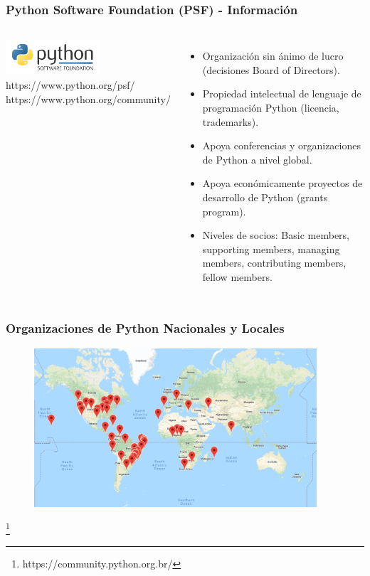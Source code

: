 \documentclass[18pt]{beamer}
\newcommand\blfootnote[1]{%
  \begingroup
  \renewcommand\thefootnote{}\footnote{#1}%
  \addtocounter{footnote}{-1}%
  \endgroup
}
\begin{document}
\begin{frame}

	\frametitle{Python Software Foundation (PSF) - Información}
		
	\begin{columns}
		\centering
			\includegraphics[width=3.5cm]{images/psf.png}\\
			\vspace{01cm}
			\scriptsize https://www.python.org/psf/
			\scriptsize https://www.python.org/community/
		\begin{itemize}
			\setlength\itemsep{0.6em}		
			\item Organización sin ánimo de lucro (decisiones Board of Directors).
			\item Propiedad intelectual de lenguaje de programación Python (licencia,
			 trademarks).
			\item Apoya conferencias y organizaciones de Python a nivel global.
			\item Apoya económicamente proyectos de desarrollo de Python (grants program).
			\item Niveles de socios: Basic members, supporting members, managing members, 
			contributing members, fellow members.  
		\end{itemize}
	\end{columns}
	
\end{frame}


\begin{frame}

	\frametitle{Organizaciones de Python Nacionales y Locales}
	
	\begin{figure}
		\includegraphics[width=10.5cm]{images/local_communities.png}
	\end{figure}
	
	\blfootnote{\scriptsize https://community.python.org.br/}
	
\end{frame}
\end{document}
